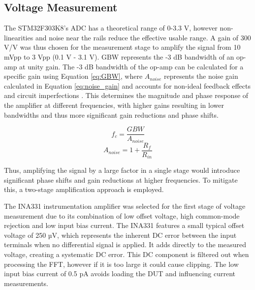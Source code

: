 \subsection{Voltage Measurement}
The STM32F303K8's \ac{ADC} has a theoretical range of 0-3.3 V, however non-linearities and noise near the rails reduce the effective usable range. A gain of 300 V/V was thus chosen for the measurement stage to amplify the signal from 10 mVpp to 3 Vpp (0.1 V - 3.1 V). \Ac{GBW} represents the -3 dB bandwidth of an op-amp at unity gain. The -3 dB bandwidth of the op-amp can be calculated for a specific gain using Equation \ref{eq:GBW}, where $A_{noise}$ represents the noise gain calculated in Equation \ref{eq:noise_gain} and accounts for non-ideal feedback effects and circuit imperfections \cite{fiore53GainBandwidthProduct2018}. This determines the magnitude and phase response of the amplifier at different frequencies, with higher gains resulting in lower bandwidths and thus more significant gain reductions and phase shifts.

\begin{equation}
    f_c = \frac{GBW}{A_{noise}}
    \label{eq:GBW}
\end{equation}
\begin{equation}
    A_{noise} = 1 + \frac{R_f}{R_{in}}
    \label{eq:noise_gain}
\end{equation}

Thus, amplifying the signal by a large factor in a single stage would introduce significant phase shifts and gain reductions at higher frequencies. To mitigate this, a two-stage amplification approach is employed.

The INA331 instrumentation amplifier was selected for the first stage of voltage measurement due to its combination of low offset voltage, high common-mode rejection and low input bias current. The INA331 features a small typical offset voltage of 250 µV, which represents the inherent DC error between the input terminals when no differential signal is applied. It adds directly to the measured voltage, creating a systematic DC error. This DC component is filtered out when processing the \ac{FFT}, however if it is too large it could cause clipping. The low input bias current of 0.5 pA avoids loading the \ac{DUT} and influencing current measurements. 

